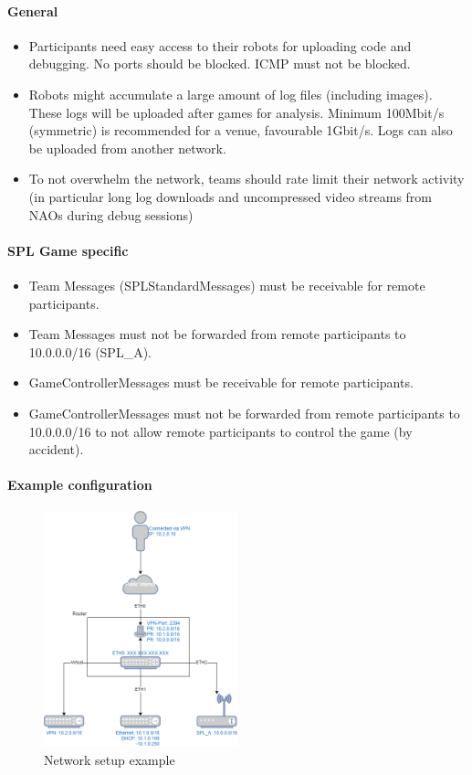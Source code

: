 \paragraph{General}

\begin{itemize}
    \item Participants need easy access to their robots for uploading code and debugging. No ports should be blocked. ICMP must not be blocked. %
    \item Robots might accumulate a large amount of log files (including images). These logs will be uploaded after games for analysis. Minimum 100Mbit/s (symmetric) is recommended for a venue, favourable 1Gbit/s. Logs can also be uploaded from another network.
    \item To not overwhelm the network, teams should rate limit their network activity (in particular long log downloads and uncompressed video streams from NAOs during debug sessions)
\end{itemize}

\paragraph{SPL Game specific}

\begin{itemize}
    \item Team Messages (SPLStandardMessages) must be receivable for remote participants.
    \item Team Messages must not be forwarded from remote participants to 10.0.0.0/16 (SPL\_A).
    \item GameControllerMessages must be receivable for remote participants.
    \item GameControllerMessages must not be forwarded from remote participants to 10.0.0.0/16 to not allow remote participants to control the game (by accident).
\end{itemize}

\paragraph{Example configuration}

\begin{figure}[ht!]
    \centering
    \includegraphics[width=0.5\textwidth]{figs/network.png}
    \caption{Network setup example}
\end{figure}

